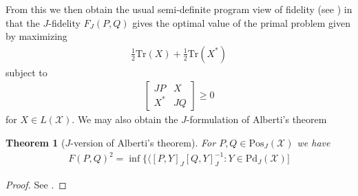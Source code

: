 \documentclass{amsart}
\numberwithin{equation}{section}
\newtheorem{theorem}{Theorem}[section]
\theoremstyle{definition}
\theoremstyle{plain}
\theoremstyle{solutionstyle}
\begin{document}
 From this we then obtain the usual semi-definite program view of fidelity (see \citep[p.~147]{Watrous_2018}) in that the $J$-fidelity $F_J(P,Q)$ gives the optimal value of the primal problem given by maximizing 
 \begin{align*}
     \frac{1}{2}\mathrm{Tr}(X)+\frac{1}{2}\mathrm{Tr}(X^*)
 \end{align*}
 subject to 
 \begin{align*}
     \begin{bmatrix}
        JP & X \\
        X^{*} & JQ
    \end{bmatrix}\geq 0
 \end{align*} for $X\in L(\mathcal{X})$.
We may also obtain the $J$-formulation of Alberti's theorem
\begin{theorem}[$J$-version of Alberti's theorem]
    For $P,Q\in \mathrm{Pos}_J(\mathcal{X})$ we have 
    \begin{align*}
        F(P,Q)^2=\inf\{\langle [P, Y]_J[Q,Y]_J^{-1}: Y\in \mathrm{Pd}_J(\mathcal{X})]
    \end{align*}
\end{theorem}
\begin{proof}
   See \citep[p.~148]{Watrous_2018}.
\end{proof}
\end{document}
